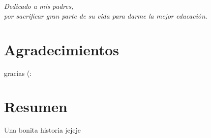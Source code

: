 \documentclass[a4paper,openright,12pt]{report}
\begin{document}
\chapter*{}
\begin{flushright}
\textit{Dedicado a mis padres, \\ por sacrificar gran parte de su vida para darme la mejor educación.\\}
\end{flushright}

\chapter*{Agradecimientos}

gracias (:

\chapter*{Resumen}

Una bonita historia jejeje

\tableofcontents
\cleardoublepage
{}
\listoffigures
\cleardoublepage
{}
\listoftables


\cleardoublepage
\end{document}
